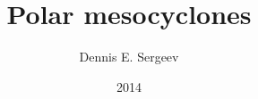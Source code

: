 \thispagestyle{empty}

\author{Dennis E. Sergeev}
\title{Polar mesocyclones}
\date{2014}
\maketitle

\newpage